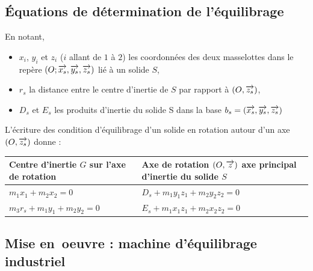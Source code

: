 \documentclass[10pt,fleqn]{article} %
\begin{document}
\ifprof
\else
\newpage
\fi

\subsection{Équations de détermination de l'équilibrage}

\begin{definition}

En notant,
\begin{itemize}
\item $x_i$, $y_i$ et $z_i$ ($i$ allant de $1$ à $2$) les coordonnées des deux masselottes dans le repère $\left(O;\overrightarrow{x_s},\overrightarrow{y_s},\overrightarrow{z_s} \right)$ lié à un solide $S$,
\item $r_s$ la distance entre le centre d'inertie de $S$ par rapport à $\left(O,\overrightarrow{{z}_s}\right)$, 
\item $D_s$ et $E_s$ les produits d'inertie du solide S dans la base $b_s=\left(\overrightarrow{{x}_s},\overrightarrow{{y}_s},\overrightarrow{{z}_s} \right)$
\end{itemize}
L'écriture des condition d'équilibrage d'un solide en rotation autour d'un axe $\left(O,\overrightarrow{{z}_s}\right)$ donne : 

\begin{tabular}{|p{6.5cm}|p{6.5cm}|}
\hline 
\textbf{Centre d'inertie $G$ sur l'axe de rotation} & \textbf{Axe de rotation $\left(O,\overrightarrow{{z}}\right)$ axe principal d'inertie du solide $S$} \\ 
\hline 
$m_1 x_1+m_2 x_2=0$
&
$D_s+m_1 y_1 z_1+ m_2 y_2 z_2 = 0$
\\ 
$m_3 r_s+m_1 y_1+m_2 y_2=0$
&
$E_s+m_1 x_1 z_1+m_2 x_2 z_2 = 0$\\
\hline 
\end{tabular} 

\end{definition}

\subsection{Mise en\ oe{}uvre : machine d'équilibrage industriel}
\end{document}
